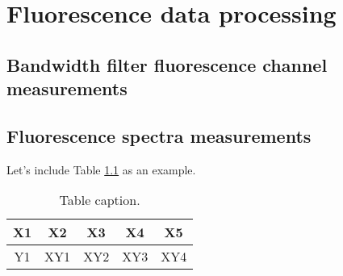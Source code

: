 \chapter{Fluorescence data processing}
\label{sect:devs02_chapter2}

\section{Bandwidth filter fluorescence channel measurements}
\label{sect::devs02_chapter1_band}

\section{Fluorescence spectra measurements}
\label{sect::devs02_chapter1_spec}

Let's include Table \ref{tab::table01} as an example.

\begin{table}[h]     
	\caption{Table caption.}
	\label{tab::table01}
	\footnotesize
	\begin{center}
		\begin{tabular}{ccccc}
			\toprule
			X1 & X2 & X3 & X4 & X5\\
			\midrule
            Y1 & XY1 & XY2 & XY3 & XY4\\
			\bottomrule
		\end{tabular}
	\end{center}
\end{table}
